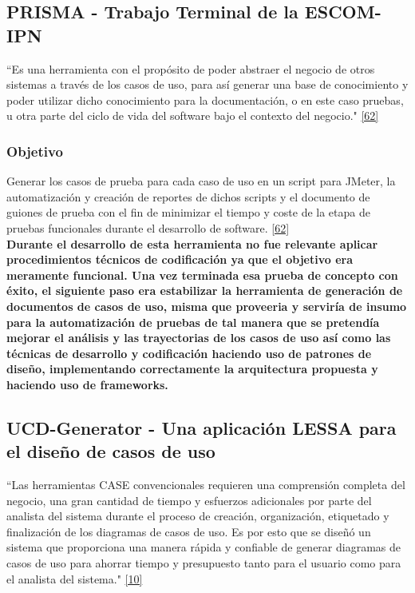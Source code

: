 \subsection{PRISMA - Trabajo Terminal de la ESCOM-IPN}
``Es una herramienta con el propósito de poder abstraer el negocio de otros sistemas a través de los casos de uso, para así generar una base de conocimiento y poder utilizar dicho conocimiento para la documentación, o en este caso pruebas, u otra parte del ciclo de vida del software bajo el contexto del negocio." \hyperlink{b62}{[62]}

\subsubsection{Objetivo}
Generar los casos de prueba para cada caso de uso en un script para JMeter, la automatización y creación de reportes de dichos scripts y el documento de guiones de prueba con el fin de minimizar el tiempo y coste de la etapa de pruebas funcionales durante el desarrollo de software. \hyperlink{b62}{[62]}\\

\textbf {Durante el desarrollo de esta herramienta no fue relevante aplicar procedimientos técnicos de codificación ya que el objetivo era meramente funcional. Una vez terminada esa prueba de concepto con éxito, el siguiente paso era estabilizar la herramienta de generación de documentos de casos de uso, misma que proveeria y serviría de insumo para la automatización de pruebas de tal manera que se pretendía mejorar el análisis y las trayectorias de los casos de uso así como las técnicas de desarrollo y codificación haciendo uso de patrones de diseño, implementando correctamente la arquitectura propuesta y haciendo uso de frameworks. }\\


\subsection{UCD-Generator - Una aplicación LESSA para el diseño de casos de uso}

``Las herramientas CASE convencionales requieren una comprensión completa del negocio, una gran cantidad de tiempo y esfuerzos adicionales por parte del analista del sistema durante el proceso de creación, organización, etiquetado y finalización de los diagramas de casos de uso. Es por esto que se diseñó un sistema que proporciona una manera rápida y confiable de generar diagramas de casos de uso para ahorrar tiempo y presupuesto tanto para el usuario como para el analista del sistema."  \hyperlink{b10}{[10]}

